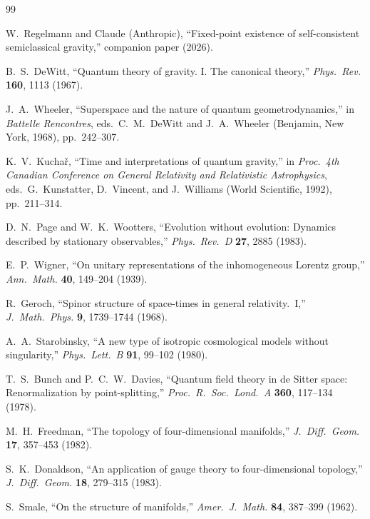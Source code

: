 \documentclass[12pt,a4paper]{article}
\theoremstyle{definition}
\theoremstyle{remark}
\begin{document}
\begin{thebibliography}{99}

W.~Regelmann and Claude (Anthropic),
``Fixed-point existence of self-consistent semiclassical gravity,''
companion paper (2026).

B.~S.~DeWitt,
``Quantum theory of gravity. I. The canonical theory,''
\textit{Phys.\ Rev.} \textbf{160}, 1113 (1967).

J.~A.~Wheeler,
``Superspace and the nature of quantum geometrodynamics,''
in \textit{Battelle Rencontres}, eds.\ C.~M.~DeWitt and J.~A.~Wheeler
(Benjamin, New York, 1968), pp.~242--307.

K.~V.~Kucha\v{r},
``Time and interpretations of quantum gravity,''
in \textit{Proc.\ 4th Canadian Conference on General Relativity and
Relativistic Astrophysics}, eds.\ G.~Kunstatter, D.~Vincent, and
J.~Williams (World Scientific, 1992), pp.~211--314.

D.~N.~Page and W.~K.~Wootters,
``Evolution without evolution: Dynamics described by stationary observables,''
\textit{Phys.\ Rev.\ D} \textbf{27}, 2885 (1983).

E.~P.~Wigner,
``On unitary representations of the inhomogeneous Lorentz group,''
\textit{Ann.\ Math.} \textbf{40}, 149--204 (1939).

R.~Geroch,
``Spinor structure of space-times in general relativity.\ I,''
\textit{J.\ Math.\ Phys.} \textbf{9}, 1739--1744 (1968).

A.~A.~Starobinsky,
``A new type of isotropic cosmological models without singularity,''
\textit{Phys.\ Lett.\ B} \textbf{91}, 99--102 (1980).

T.~S.~Bunch and P.~C.~W.~Davies,
``Quantum field theory in de Sitter space: Renormalization by point-splitting,''
\textit{Proc.\ R.\ Soc.\ Lond.\ A} \textbf{360}, 117--134 (1978).

M.~H.~Freedman,
``The topology of four-dimensional manifolds,''
\textit{J.\ Diff.\ Geom.} \textbf{17}, 357--453 (1982).

S.~K.~Donaldson,
``An application of gauge theory to four-dimensional topology,''
\textit{J.\ Diff.\ Geom.} \textbf{18}, 279--315 (1983).

S.~Smale,
``On the structure of manifolds,''
\textit{Amer.\ J.\ Math.} \textbf{84}, 387--399 (1962).


\end{thebibliography}
\end{document}
